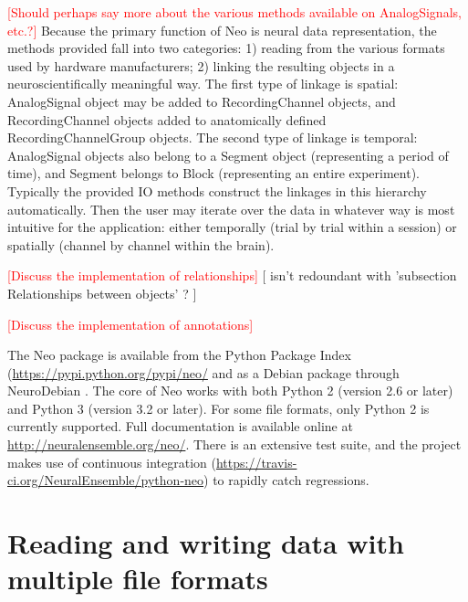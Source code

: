 \documentclass{frontiers}
\newcommand{\documentation}{\url{http://neuralensemble.org/neo/}}
\newcommand{\missing}[1]{\textcolor{red}{#1}}
\newcommand{\samuel}[1]{[\textcolor{RubineRed}{#1}]}
\begin{document}
\missing{[Should perhaps say more about the various methods available on AnalogSignals, etc.?]}
Because the primary function of Neo is neural data representation, the methods provided fall into two categories: 1) reading from the various formats used by hardware manufacturers; 2) linking the resulting objects in a neuroscientifically meaningful way.
The first type of linkage is spatial: AnalogSignal object may be added to RecordingChannel objects, and RecordingChannel objects added to anatomically defined RecordingChannelGroup objects.
The second type of linkage is temporal: AnalogSignal objects also belong to a Segment object (representing a period of time), and Segment belongs to Block (representing an entire experiment).
Typically the provided IO methods construct the linkages in this hierarchy automatically.
Then the user may iterate over the data in whatever way is most intuitive for the application: either temporally (trial by trial within a session) or spatially (channel by channel within the brain).

\missing{[Discuss the implementation of relationships]}
\samuel{ isn't redoundant with  'subsection Relationships between objects' ? }

\missing{[Discuss the implementation of annotations]}

The Neo package is available from the Python Package Index (\url{https://pypi.python.org/pypi/neo/} and as a Debian package through NeuroDebian \citep{Halchenko2012}.
The core of Neo works with both Python 2 (version 2.6 or later) and Python 3 (version 3.2 or later).
For some file formats, only Python 2 is currently supported.
Full documentation is available online at \documentation.
There is an extensive test suite, and the project makes use of continuous integration (\url{https://travis-ci.org/NeuralEnsemble/python-neo}) to rapidly catch regressions.


\section{Reading and writing data with multiple file formats}

\end{document}
